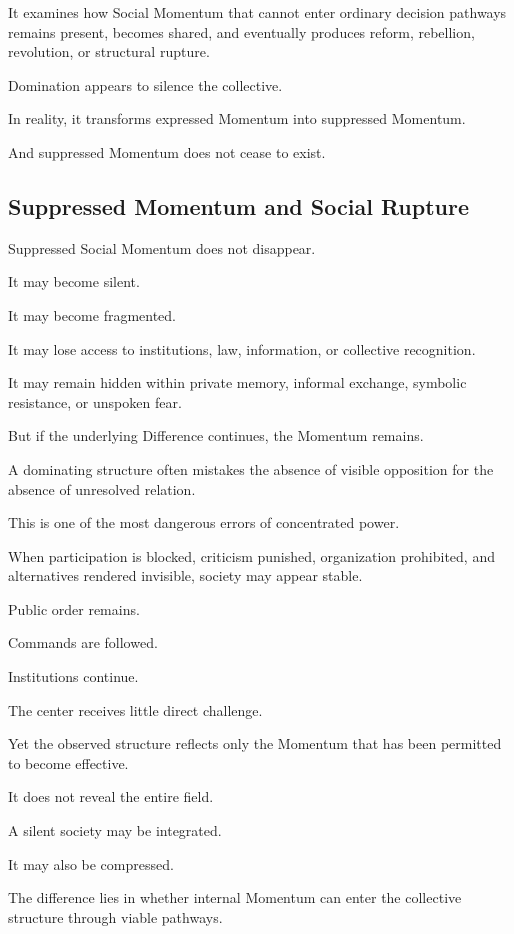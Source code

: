 It examines how Social Momentum that cannot enter ordinary decision pathways remains present, becomes shared, and eventually produces reform, rebellion, revolution, or structural rupture.

Domination appears to silence the collective.

In reality, it transforms expressed Momentum into suppressed Momentum.

And suppressed Momentum does not cease to exist.

\subsection*{\textbf{Suppressed Momentum and Social Rupture}}


Suppressed Social Momentum does not disappear.

It may become silent.

It may become fragmented.

It may lose access to institutions, law, information, or collective recognition.

It may remain hidden within private memory, informal exchange, symbolic resistance, or unspoken fear.

But if the underlying Difference continues, the Momentum remains.

A dominating structure often mistakes the absence of visible opposition for the absence of unresolved relation.

This is one of the most dangerous errors of concentrated power.

When participation is blocked, criticism punished, organization prohibited, and alternatives rendered invisible, society may appear stable.

Public order remains.

Commands are followed.

Institutions continue.

The center receives little direct challenge.

Yet the observed structure reflects only the Momentum that has been permitted to become effective.

It does not reveal the entire field.

A silent society may be integrated.

It may also be compressed.

The difference lies in whether internal Momentum can enter the collective structure through viable pathways.

